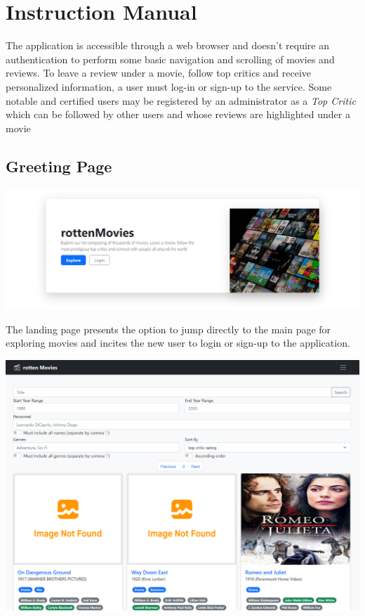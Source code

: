 %
%

\chapter{Instruction Manual}

The application is accessible through a web browser and doesn't require an authentication to perform some basic navigation and scrolling of movies and reviews. To leave a review under a movie, follow top critics and receive personalized information, a user must log-in or sign-up to the service. Some notable and certified users may be registered by an administrator as a \textit{Top Critic} which can be followed by other users and whose reviews are highlighted under a movie

\section{Greeting Page}

\hspace{-45pt}
\includegraphics[scale=0.45]{../../../images/user_manual/index.png} 


The landing page presents the option to jump directly to the main page for exploring movies and incites the new user to login or sign-up to the application.
\begin{center}
\includegraphics[scale=0.45]{../../../images/user_manual/search.png} 
\end{center}
\vspace{5pt}

